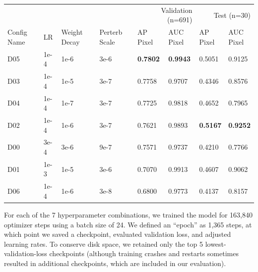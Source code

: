 \begin{table}[t]
\ifwacv \else \VitResultCaption \fi
\centering
\begin{tabular}{llllllll}
\toprule
            \multicolumn{4}{l}{} & \multicolumn{2}{r}{Validation (n=691)} & \multicolumn{2}{r}{Test (n=30)} \\
Config Name  &   LR & Weight Decay & Perterb Scale & \makecell{AP\\Pixel} & \makecell{AUC\\Pixel} &  \makecell{AP\\Pixel} &  \makecell{AUC\\Pixel} \\
\midrule
        \textcolor[HTML]{623682}{D05} & 1e-4 &   1e-6 &  3e-6 & \textbf{0.7802} & \textbf{0.9943} &          0.5051 &          0.9125 \\
        \textcolor[HTML]{df8020}{D03} & 1e-4 &   1e-5 &  3e-7 &          0.7758 &          0.9707 &          0.4346 &          0.8576 \\
        \textcolor[HTML]{87b787}{D04} & 1e-4 &   1e-7 &  3e-7 &          0.7725 &          0.9818 &          0.4652 &          0.7965 \\
        \textcolor[HTML]{207fdf}{D02} & 1e-4 &   1e-6 &  3e-7 &          0.7621 &          0.9893 & \textbf{0.5167} & \textbf{0.9252} \\
        \textcolor[HTML]{20df20}{D00} & 3e-4 &   3e-6 &  9e-7 &          0.7571 &          0.9737 &          0.4210 &          0.7766 \\
        \textcolor[HTML]{df20df}{D01} & 1e-3 &   1e-5 &  3e-6 &          0.7070 &          0.9913 &          0.4607 &          0.9062 \\
        \textcolor[HTML]{b00403}{D06} & 1e-4 &   1e-6 &  3e-8 &          0.6800 &          0.9773 &          0.4137 &          0.8157 \\
        
\bottomrule
\end{tabular}
\ifwacv \VitResultCaption \fi
\end{table}

For each of the 7 hyperparameter combinations, we trained the model for 163,840 optimizer steps using a
  batch size of 24.
We defined an ``epoch'' as 1,365 steps, at which point we saved a checkpoint, evaluated validation loss, and
  adjusted learning rates.
To conserve disk space, we retained only the top 5 lowest-validation-loss checkpoints (although training
  crashes and restarts sometimes resulted in additional checkpoints, which are included in our evaluation).

